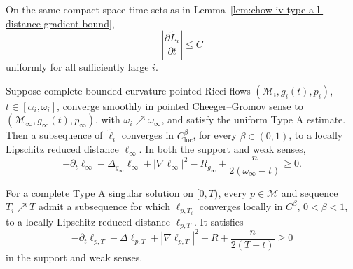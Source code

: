 \begin{lemma}
\label{lem:chow-iv-type-a-l-distance-time-bound}
On the same compact space-time sets as in
Lemma~\ref{lem:chow-iv-type-a-l-distance-gradient-bound},
\[
 \left|\frac{\partial\widetilde L_i}{\partial t}\right|\leq C
\]
uniformly for all sufficiently large \(i\).
\end{lemma}

\begin{theorem}
\label{thm:chow-iv-singular-time-reduced-distance-limit}
Suppose complete bounded-curvature pointed Ricci flows
\((\mathcal M_i,g_i(t),p_i)\), \(t\in[\alpha_i,\omega_i]\), converge smoothly
in pointed Cheeger--Gromov sense to
\((\mathcal M_\infty,g_\infty(t),p_\infty)\), with
\(\omega_i\nearrow\omega_\infty\), and satisfy the uniform Type A estimate.
Then a subsequence of \(\widetilde\ell_i\) converges in
\(C^\beta_{\mathrm{loc}}\), for every \(\beta\in(0,1)\), to a locally
Lipschitz reduced distance \(\ell_\infty\).  In both the support and weak
senses,
\[
 -\partial_t\ell_\infty-\Delta_{g_\infty}\ell_\infty
 +|\nabla\ell_\infty|^2-R_{g_\infty}
 +\frac{n}{2(\omega_\infty-t)}\geq0.
\]
\end{theorem}

\begin{corollary}
\label{cor:chow-iv-type-a-singular-time-reduced-distance}
For a complete Type A singular solution on \([0,T)\), every \(p\in\mathcal M\)
and sequence \(T_i\nearrow T\) admit a subsequence for which
\(\ell_{p,T_i}\) converges locally in \(C^\beta\), \(0<\beta<1\), to a
locally Lipschitz reduced distance \(\ell_{p,T}\).  It satisfies
\[
 -\partial_t\ell_{p,T}-\Delta\ell_{p,T}+|\nabla\ell_{p,T}|^2-R
 +\frac{n}{2(T-t)}\geq0
\]
in the support and weak senses.
\end{corollary}

